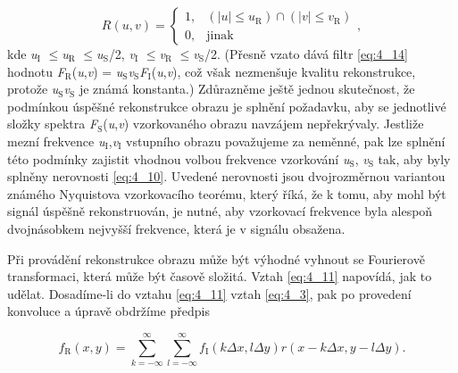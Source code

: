 \begin{equation} \label{eq:4_14} 
    R(u, v) = \left\{
    \begin{array}{cc}
    1, & {\left(|u|\le u_\mathrm{R} \right)\cap \left(|v|\le v_\mathrm{R} \right)} \\
    0, & \mathrm{jinak}
    \end{array}
    \right.,
\end{equation} 
kde \textit{u}$_\mathrm{I}$ $\leq$\textit{u}$_\mathrm{R}$ $\leq$\textit{u}$_\mathrm{S}$/2, \textit{v}$_\mathrm{I}$ $\leq$\textit{v}$_\mathrm{R}$ $\leq$\textit{v}$_\mathrm{S}$/2. (Přesně vzato dává filtr \eqref{eq:4_14} hodnotu \textit{F}$_\mathrm{R}$(\textit{u},\textit{v}) = \textit{u}$_\mathrm{S}$\textit{v}$_\mathrm{S}$\textit{F}$_\mathrm{I}$(\textit{u},\textit{v}), což však nezmenšuje kvalitu rekonstrukce, protože \textit{u}$_\mathrm{S}$\textit{v}$_\mathrm{S}$ je známá konstanta.) Zdůrazněme ještě jednou skutečnost, že podmínkou úspěšné rekonstrukce obrazu je splnění požadavku, aby se jednotlivé složky spektra \textit{F}$_\mathrm{S}$(\textit{u},\textit{v}) vzorkovaného obrazu navzájem nepřekrývaly. Jestliže mezní frekvence \textit{u}$_\mathrm{I}$,\textit{v}$_\mathrm{I}$ vstupního obrazu považujeme za neměnné, pak lze splnění této podmínky zajistit vhodnou volbou frekvence vzorkování \textit{u}$_\mathrm{S}$, \textit{v}$_\mathrm{S}$ tak, aby byly splněny nerovnosti \eqref{eq:4_10}. Uvedené nerovnosti jsou dvojrozměrnou variantou známého Nyquistova vzorkovacího teorému, který říká, že k tomu, aby mohl být signál úspěšně rekonstruován, je nutné, aby vzorkovací frekvence byla alespoň dvojnásobkem nejvyšší frekvence, která je v signálu obsažena.

Při provádění rekonstrukce obrazu může být výhodné vyhnout se Fourierově transformaci, která může být časově složitá. Vztah \eqref{eq:4_11} napovídá, jak to udělat. Dosadíme-li do vztahu \eqref{eq:4_11} vztah \eqref{eq:4_3}, pak po provedení konvoluce a úpravě obdržíme předpis

\begin{equation} \label{eq:4_15}
    f_\mathrm{R}(x, y) = \sum\limits_{k=-\infty}^{\infty} \sum\limits_{l=-\infty}^{\infty} f_\mathrm{I} (k\Delta x, l\Delta y) r(x - k\Delta x, y - l\Delta y).
\end{equation}

